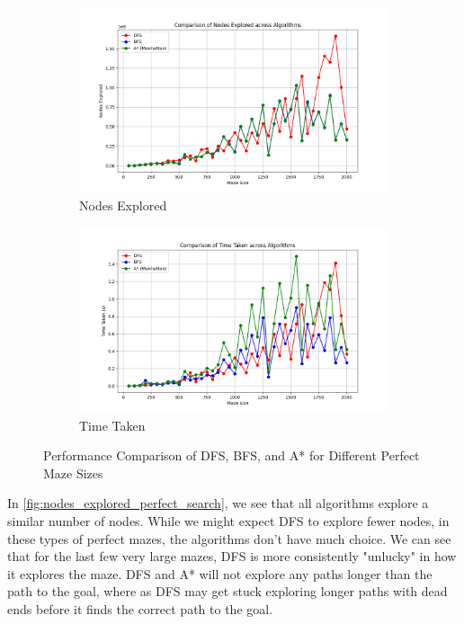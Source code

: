 \documentclass{article}
\begin{document}
\begin{figure}[h]
    \centering
    \begin{subfigure}[b]{0.49\textwidth}
        \centering
        \includegraphics[width=\textwidth]{comparison_perfect_nodes_explored.png}
        \caption{Nodes Explored}
        \label{fig:nodes_explored_perfect_search}
    \end{subfigure}
    \begin{subfigure}[b]{0.49\textwidth}
        \centering
        \includegraphics[width=\textwidth]{comparison_perfect_time_taken.png}
        \caption{Time Taken}
        \label{fig:time_taken_perfect_search}
    \end{subfigure}
    \caption{Performance Comparison of DFS, BFS, and A* for Different Perfect Maze Sizes}
    \label{fig:search_comparison}
\end{figure}

In \autoref{fig:nodes_explored_perfect_search}, we see that all algorithms explore a similar number of nodes. While we might expect DFS to explore fewer nodes, in these types of perfect mazes, the algorithms don't have much choice. We can see that for the last few very large mazes, DFS is more consistently "unlucky" in how it explores the maze. DFS and A* will not explore any paths longer than the path to the goal, where as DFS may get stuck exploring longer paths with dead ends before it finds the correct path to the goal.
\end{document}

